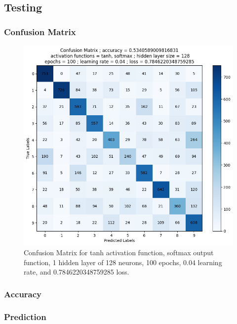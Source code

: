 \documentclass[utf8,1pt]{extarticle} %
\begin{document}
\subsection{Testing}
\subsubsection{Confusion Matrix}
\begin{figure}
    \centering
    \includegraphics[width=\textwidth]{media/confusion/confusion_matrix_activation_functions_tanh_softmax_hidden_layer_size_128_epochs_100_learning_rate_0.04_loss_0.7846220348759285.png}
    \caption{Confusion Matrix for tanh activation function, softmax output function, 1 hidden layer of 128 neurons, 100 epochs, 0.04 learning rate, and 0.7846220348759285 loss.}
    \label{fig:confusion}
\end{figure}
\subsubsection{Accuracy}
\subsubsection{Prediction}
\end{document}
